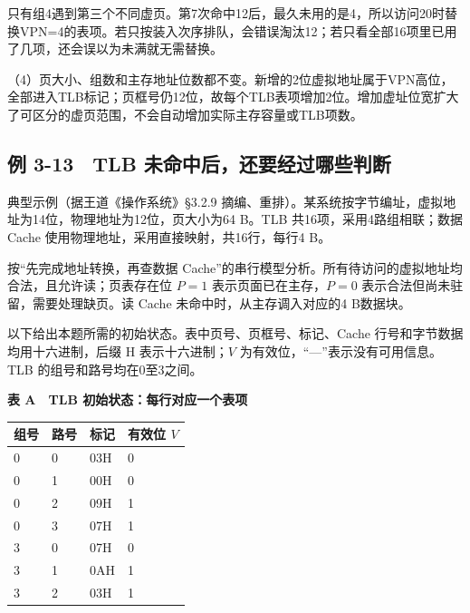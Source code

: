 只有组4遇到第三个不同虚页。第7次命中12后，最久未用的是4，所以访问20时替换VPN=4的表项。若只按装入次序排队，会错误淘汰12；若只看全部16项里已用了几项，还会误以为未满就无需替换。

（4）页大小、组数和主存地址位数都不变。新增的2位虚拟地址属于VPN高位，全部进入TLB标记；页框号仍12位，故每个TLB表项增加2位。增加虚址位宽扩大了可区分的虚页范围，不会自动增加实际主存容量或TLB项数。

\subsection{例 3-13　TLB 未命中后，还要经过哪些判断}\label{CO03-31}

\begin{example}[配套例题]

典型示例（据王道《操作系统》§3.2.9 摘编、重排）。某系统按字节编址，虚拟地址为14位，物理地址为12位，页大小为64 B。TLB 共16项，采用4路组相联；数据 Cache 使用物理地址，采用直接映射，共16行，每行4 B。

按``先完成地址转换，再查数据 Cache''的串行模型分析。所有待访问的虚拟地址均合法，且允许读；页表存在位 \(P=1\) 表示页面已在主存，\(P=0\) 表示合法但尚未驻留，需要处理缺页。读 Cache 未命中时，从主存调入对应的4 B数据块。

以下给出本题所需的初始状态。表中页号、页框号、标记、Cache 行号和字节数据均用十六进制，后缀 H 表示十六进制；\(V\) 为有效位，``---''表示没有可用信息。TLB 的组号和路号均在0至3之间。

\textbf{表 A　TLB 初始状态：每行对应一个表项}

\begin{wideblock}\par\medskip\noindent\begin{minipage}{\linewidth}\fontsize{9.3}{12}\selectfont\begin{tabularx}{\linewidth}{@{}YYYY@{}}
\toprule\noalign{}
组号 & 路号 & 标记 & 有效位 \(V\) \\
\midrule\noalign{}


0 & 0 & 03H & 0 \\
0 & 1 & 00H & 0 \\
0 & 2 & 09H & 1 \\
0 & 3 & 07H & 1 \\
3 & 0 & 07H & 0 \\
3 & 1 & 0AH & 1 \\
3 & 2 & 03H & 1 \\
\bottomrule\end{tabularx}
\end{minipage}\par\medskip\end{wideblock}


\end{example}
